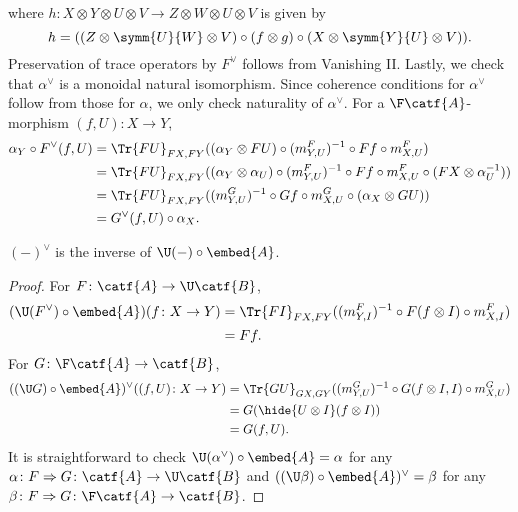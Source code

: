 where \(h \colon X \otimes Y \otimes U \otimes V \to Z \otimes W \otimes U \otimes V\)
is given by
\begin{equation*}
  h = ((Z \otimes \symm{U}{W} \otimes V) \circ (f \otimes g) \circ
  (X \otimes \symm{Y}{U} \otimes V)).
\end{equation*}
Preservation of trace operators by \(F^{\vee}\) follows from
Vanishing II. Lastly, we check that \(\alpha^{\vee}\) is a monoidal
natural isomorphism. Since coherence conditions for \(\alpha^{\vee}\)
follow from those for \(\alpha\), we only check naturality of \(\alpha^{\vee}\).
For a \(\F\catf{A}\)-morphism \((f,U) \colon X \to Y\),
\begin{align*}
  \alpha_{Y} \circ F^{\vee}(f,U)
  &= \Tr{FU}_{FX,FY}((\alpha_{Y} \otimes FU) \circ (m^{F}_{Y,U})^{-1} \circ Ff \circ m^{F}_{X,U}) \\
  &= \Tr{FU}_{FX,FY}((\alpha_{Y} \otimes \alpha_{U}) \circ (m^{F}_{Y,U})^{-1} \circ Ff \circ m^{F}_{X,U}
  \circ (FX \otimes \alpha^{-1}_{U})) \\
  &= \Tr{FU}_{FX,FY}((m^{G}_{Y,U})^{-1} \circ Gf \circ m^{G}_{X,U}
  \circ (\alpha_{X} \otimes GU)) \\
  &= G^{\vee} (f,U) \circ \alpha_{X}.
\end{align*}



\begin{proposition}
  \((-)^{\vee}\) is the inverse of \(\U(-) \circ \embed{A}\).
\end{proposition}
\begin{proof}
  For \(F \colon \catf{A} \to \U\catf{B}\),
  \begin{align*}
    (\U (F^{\vee}) \circ \embed{A})(f \colon X \to Y)
    &= \Tr{FI}_{FX,FY} ((m^{F}_{Y,I})^{-1} \circ F(f \otimes I) \circ m^{F}_{X,I}) \\
    &= Ff.
  \end{align*}
  For \(G \colon \F\catf{A} \to \catf{B}\),
  \begin{align*}
    ((\U G) \circ \embed{A})^{\vee}((f,U) \colon X \to Y)
    &= \Tr{GU}_{GX,GY}((m^{G}_{Y,U})^{-1} \circ G(f \otimes I,I) \circ m^{G}_{X,U}) \\
    &= G(\hide{U \otimes I}(f \otimes I)) \\
    &= G(f,U).
  \end{align*}
  It is straightforward to check
  \(\U (\alpha^{\vee}) \circ \embed{A} = \alpha\)
  for any \(\alpha \colon F \Rightarrow G \colon \catf{A} \to \U\catf{B}\)
  and \(((\U \beta) \circ \embed{A})^{\vee} = \beta\) 
  for any \(\beta \colon F \Rightarrow G \colon \F\catf{A} \to \catf{B}\).
\end{proof}

